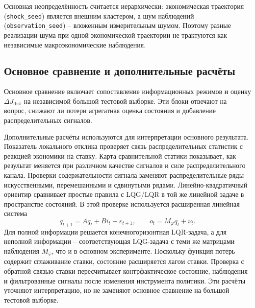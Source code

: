 Основная неопределённость считается иерархически: экономическая траектория
(\texttt{shock\_seed}) является внешним кластером, а шум наблюдений (\texttt{observation\_seed})
-- вложенным измерительным шумом. Поэтому разные реализации шума при одной экономической
траектории не трактуются как независимые макроэкономические наблюдения.

\subsection{Основное сравнение и дополнительные расчёты}

Основное сравнение включает сопоставление информационных режимов и оценку
\(\Delta J_{\mathrm{dist}}\) на независимой большой тестовой выборке. Эти блоки отвечают на вопрос,
снижают ли потери агрегатная оценка состояния и добавление распределительных сигналов.

Дополнительные расчёты используются для интерпретации основного результата. Показатель локального
отклика проверяет связь распределительных статистик с реакцией экономики на ставку. Карта
сравнительной статики показывает, как результат меняется при различном качестве сигналов и силе
распределительного канала. Проверки содержательности сигнала заменяют распределительные ряды
искусственными, перемешанными и сдвинутыми рядами. Линейно-квадратичный ориентир сравнивает
простые правила с LQG/LQR в той же линейной задаче в пространстве состояний. В этой проверке
используется расширенная линейная система
\[
q_{t+1}=Aq_t+B i_t+\varepsilon_{t+1},
\qquad
o_t=M_\varphi q_t+\nu_t.
\]
Для полной информации решается конечногоризонтная LQR-задача, а для неполной информации --
соответствующая LQG-задача с теми же матрицами наблюдения \(M_\varphi\), что и в основном
эксперименте. Поскольку функция потерь содержит сглаживание ставки, состояние расширяется лагом
ставки.
Проверка с обратной связью ставки пересчитывает контрфактическое состояние, наблюдения и
фильтрованные сигналы после изменения инструмента политики. Эти расчёты уточняют интерпретацию,
но не заменяют основное сравнение на большой тестовой выборке.
